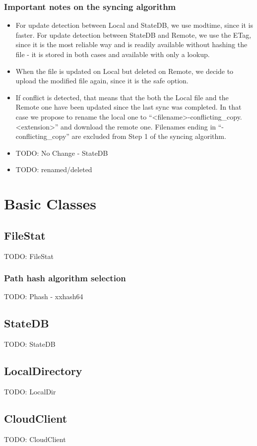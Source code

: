     \subsubsection{Important notes on the syncing algorithm}
    \begin{itemize}
      \item For update detection between Local and StateDB, we use modtime, since it is faster. For update detection between StateDB and Remote, we use the ETag, since it is the most reliable way and is readily available without hashing the file - it is stored in both cases and available with only a lookup.
      \item When the file is updated on Local but deleted on Remote, we decide to upload the modified file again, since it is the safe option.
      \item If conflict is detected, that means that the both the Local file and the Remote one have been updated since the last sync was completed. In that case we propose to rename the local one to ``<filename>-conflicting\_copy.<extension>'' and download the remote one. Filenames ending in ``-conflicting\_copy'' are excluded from Step 1 of the syncing algorithm.
      \item TODO: No Change - StateDB
      \item TODO: renamed/deleted
    \end{itemize}


\section{Basic Classes}
  \subsection{FileStat}
    TODO: FileStat
    \subsubsection{Path hash algorithm selection}
      TODO: Phash - xxhash64
  \subsection{StateDB}
    TODO: StateDB
  \subsection{LocalDirectory}
    TODO: LocalDir
  \subsection{CloudClient}
    TODO: CloudClient

